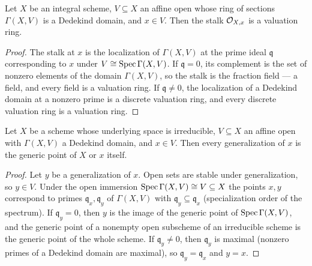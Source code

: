 \begin{theorem}
  \label{pa-thm:affine_dedekind_stalk_valuation}
  \leanok

  Let \(X\) be an integral scheme, \(V \subseteq X\) an affine open whose ring of sections
  \(\Gamma(X, V)\) is a Dedekind domain, and \(x \in V\). Then the stalk
  \(\mathcal{O}_{X,x}\) is a valuation ring.
\end{theorem}
\begin{proof}
  \leanok
  The stalk at \(x\) is the localization of \(\Gamma(X, V)\) at the prime ideal
  \(\mathfrak q\) corresponding to \(x\) under \(V \cong \operatorname{Spec} \Gamma(X, V)\). If
  \(\mathfrak q = 0\), its complement is the set of nonzero elements of the domain
  \(\Gamma(X, V)\), so the stalk is the fraction field --- a field, and every field is a
  valuation ring. If \(\mathfrak q \neq 0\), the localization of a Dedekind domain at a
  nonzero prime is a discrete valuation ring, and every discrete valuation ring is a
  valuation ring.
\end{proof}

\begin{theorem}
  \label{pa-thm:affine_dedekind_specializes}
  \leanok

  Let \(X\) be a scheme whose underlying space is irreducible, \(V \subseteq X\) an affine
  open with \(\Gamma(X, V)\) a Dedekind domain, and \(x \in V\). Then every generalization
  of \(x\) is the generic point of \(X\) or \(x\) itself.
\end{theorem}
\begin{proof}
  \leanok
  Let \(y\) be a generalization of \(x\). Open sets are stable under generalization, so
  \(y \in V\). Under the open immersion \(\operatorname{Spec} \Gamma(X, V) \cong V \subseteq X\) the
  points \(x, y\) correspond to primes \(\mathfrak q_x, \mathfrak q_y\) of
  \(\Gamma(X, V)\) with \(\mathfrak q_y \subseteq \mathfrak q_x\) (specialization order of
  the spectrum). If \(\mathfrak q_y = 0\), then \(y\) is the image of the generic point of
  \(\operatorname{Spec} \Gamma(X, V)\), and the generic point of a nonempty open subscheme of an
  irreducible scheme is the generic point of the whole scheme. If \(\mathfrak q_y \neq 0\),
  then \(\mathfrak q_y\) is maximal (nonzero primes of a Dedekind domain are maximal), so
  \(\mathfrak q_y = \mathfrak q_x\) and \(y = x\).
\end{proof}

